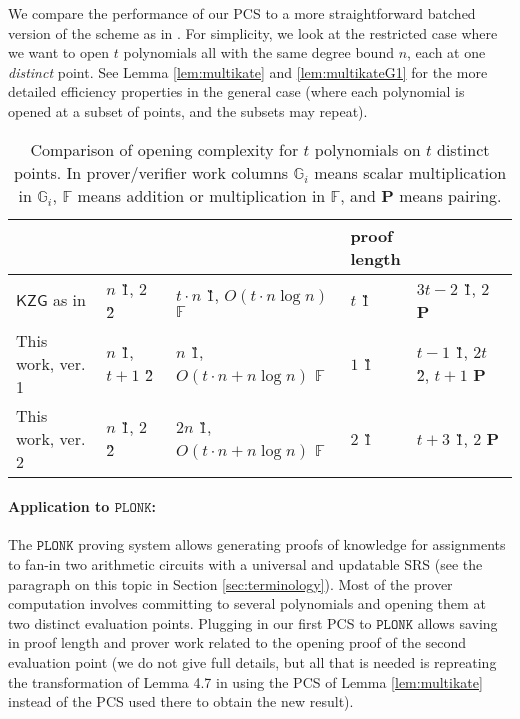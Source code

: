 \documentclass[11pt]{article} %
\newcommand{\Gi}{\ensuremath{{\mathbb G}_i}\xspace}
\newcommand{\F}{\ensuremath{\mathbb F}\xspace}
\newcommand{\kate}{\ensuremath{\mathsf{KZG}}\xspace}
\newcommand{\plonk}{\ensuremath{\mathtt{PLONK}}\xspace}
\begin{document}
We compare the performance of our PCS to a more straightforward batched version of the \cite{kate} scheme as in \cite{plonk}.
For simplicity, we look at the restricted case where we want to open $t$ polynomials all with the same degree bound $n$, each at one \emph{distinct} point. See Lemma \ref{lem:multikate} and \ref{lem:multikateG1} for the more detailed efficiency properties in the general case (where each polynomial is opened at a subset of points, and the subsets may repeat).
\begin{table}[!htbp]
	\caption{Comparison of opening complexity for $t$ polynomials on $t$ distinct points. In prover/verifier work columns \Gi means scalar multiplication in \Gi, \F means addition or multiplication in \F, and \textbf{P} means pairing. }
	\centering
\begin{adjustbox}{width=1\textwidth}
	\begin{tabular}{l|l|l|l|l}
	& \thead{SRS size} & \thead{prover work} & \thead{proof\\ length} & \thead{verifier work} \\ \hline
		\kate as in \cite{plonk}
		         & $n$ \G1, $2$ \G2  & $t\cdot n$ \G1, $O(t\cdot n\log n)$ \F &   $t$ \G1 &  $3t-2$ \G1, $2$ \textbf{P}\\ \hline
		This work, ver. 1     & $n$ \G1, $t+1$ \G2 &   $n$ \G1, $O(t\cdot n + n\log n)$ \F  & $1$ \G1 & $t-1$ \G1, $2t$ \G2, $t+1$ \textbf{P}   \\ \hline
	This work, ver. 2     & $n$ \G1, $2$ \G2 &   $2n$ \G1, $O(t\cdot n + n\log n)$ \F  & $2$ \G1 & $t+3$ \G1, $2$ \textbf{P}   \\ \hline

	\end{tabular}
\end{adjustbox}
\label{table:prover-work}
\end{table}



\paragraph{Application to \plonk:}


The \plonk proving system \cite{plonk}  allows generating proofs of knowledge for assignments
to fan-in two arithmetic circuits with a universal and updatable SRS (see the paragraph on this topic in Section \ref{sec:terminology}). Most of the prover computation involves committing to several polynomials and opening them at two distinct evaluation points. Plugging in our first PCS to \plonk allows saving in proof length and prover work related to the opening proof of the second evaluation point (we do not give full details, but all that is needed is repreating the transformation of Lemma 4.7 in \cite{plonk} using the PCS of Lemma \ref{lem:multikate} instead of the PCS used there to obtain the new result).
\end{document}
